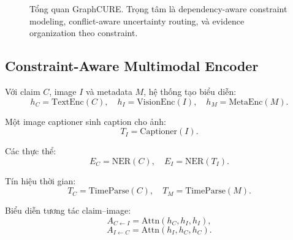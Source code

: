 \documentclass[11pt,a4paper]{article}
\begin{document}
\begin{figure}[htbp]
\centering
{}
\caption{Tổng quan GraphCURE. Trọng tâm là dependency-aware constraint modeling, conflict-aware uncertainty routing, và evidence organization theo constraint.}
\label{fig:overview}
\end{figure}

\subsection{Constraint-Aware Multimodal Encoder}

Với claim $C$, image $I$ và metadata $M$, hệ thống tạo biểu diễn:
\[
h_C = \text{TextEnc}(C), \quad
h_I = \text{VisionEnc}(I), \quad
h_M = \text{MetaEnc}(M).
\]

Một image captioner sinh caption cho ảnh:
\[
T_I = \text{Captioner}(I).
\]

Các thực thể:
\[
E_C = \text{NER}(C), \quad E_I = \text{NER}(T_I).
\]

Tín hiệu thời gian:
\[
T_C = \text{TimeParse}(C), \quad T_M = \text{TimeParse}(M).
\]

Biểu diễn tương tác claim--image:
\[
A_{C \leftarrow I} = \text{Attn}(h_C,h_I,h_I),
\]
\[
A_{I \leftarrow C} = \text{Attn}(h_I,h_C,h_C).
\]
\end{document}
